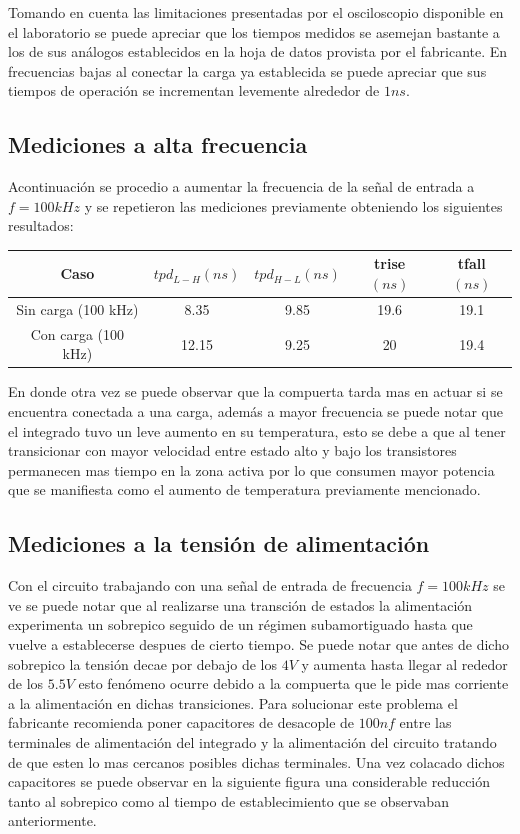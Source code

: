 Tomando en cuenta las limitaciones presentadas por el osciloscopio disponible en el laboratorio se puede apreciar que los tiempos medidos se asemejan bastante a los de sus análogos establecidos en la hoja de datos provista por el fabricante. En frecuencias bajas al conectar la carga  ya establecida se puede apreciar que sus tiempos de operación se incrementan levemente alrededor de $1 ns$. 

\subsection{Mediciones a alta frecuencia}
Acontinuación se procedio a aumentar la frecuencia de la señal de entrada a $f=100 kHz$ y se repetieron las mediciones previamente obteniendo los siguientes resultados:


\begin{table}[H]
\centering
\begin{tabular}{|c|c|c|c|c|}
\hline

Caso & $tpd_{L-H}(ns)$ & $tpd_{H-L}(ns)$ & trise$(ns)$ & tfall$(ns)$ \\ \hline
Sin carga (100 kHz) & 8.35 & 9.85 & 19.6 & 19.1 \\ \hline
Con carga (100 kHz) & 12.15 & 9.25 & 20 & 19.4 \\ \hline
\end{tabular}
\end{table}

En donde otra vez se puede observar que la compuerta tarda mas en actuar si se encuentra conectada a una carga, además a mayor frecuencia se puede notar que el integrado tuvo un leve aumento en su temperatura, esto se debe a que al tener transicionar con mayor velocidad entre estado alto y bajo los transistores permanecen mas tiempo en la zona activa por lo que consumen mayor potencia que se manifiesta como el aumento de temperatura previamente mencionado.

\subsection{Mediciones a la tensión de alimentación}
Con el circuito trabajando con una señal de entrada de frecuencia $f=100 kHz$ se ve se puede notar que al realizarse una transción de estados la alimentación experimenta un sobrepico seguido de un régimen subamortiguado hasta que vuelve a establecerse despues de cierto tiempo. Se puede notar que antes de dicho sobrepico la tensión decae por debajo de los $4V$ y aumenta hasta llegar al rededor de los $5.5V$ esto fenómeno ocurre debido a la compuerta que le pide mas corriente a la alimentación en dichas transiciones.
Para solucionar este problema el fabricante recomienda poner capacitores de desacople de $100 nf$ entre las terminales de alimentación del integrado y la alimentación del circuito tratando de que esten lo mas cercanos posibles dichas terminales. Una vez colacado dichos capacitores se puede observar en la siguiente figura una considerable reducción tanto al sobrepico como al tiempo de establecimiento que se observaban anteriormente.



